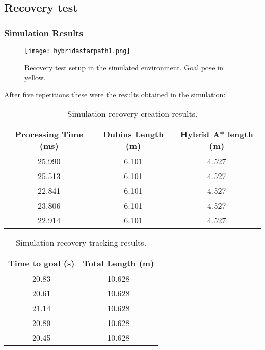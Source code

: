 \subsection{Recovery test}
\label{subsec:recovery_test}

\subsubsection{Simulation Results}

\begin{figure}[h]
    \centering
    \texttt{[image: hybridastarpath1.png]}
    \caption{Recovery test setup in the simulated environment. Goal pose in yellow.}
    \label{fig:recovery_test}
\end{figure}
After five repetitions these were the results obtained in the simulation:

\begin{table}[H]
    \centering
    \begin{tabular}{|c|c|c|}
        \hline
        \textbf{Processing Time (ms)} & \textbf{Dubins Length (m)} & \textbf{Hybrid A* length (m)} \\
        \hline
         25.990 & 6.101 & 4.527 \\
        \hline
         25.513 & 6.101 & 4.527 \\
         \hline
         22.841 & 6.101 & 4.527 \\
         \hline
         23.806 & 6.101 & 4.527 \\
         \hline
         22.914 & 6.101 & 4.527 \\
         \hline
    \end{tabular}
    \caption{Simulation recovery creation results.}
    \label{tab:recovery_path_results1}
\end{table}
\begin{table}[H]
    \centering
    \begin{tabular}{|c|c|}
        \hline
        \textbf{Time to goal (s)} & \textbf{Total Length (m)} \\
         \hline
         20.83 & 10.628 \\
         \hline
         20.61 & 10.628 \\
         \hline
         21.14 & 10.628 \\
         \hline
         20.89 & 10.628 \\
         \hline
         20.45 & 10.628 \\
         \hline
    \end{tabular}
    \caption{Simulation recovery tracking results.}
    \label{tab:recovery_path_results2}
\end{table}

